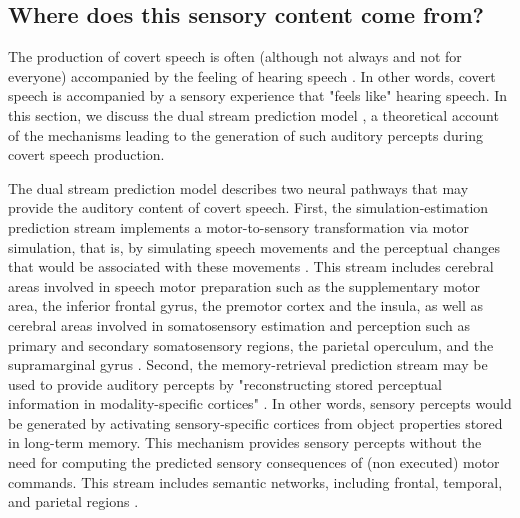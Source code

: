 \documentclass[utf8]{template/frontiersSCNS} %
\begin{document}
\subsection{Where does this sensory content come from?}

The production of covert speech is often (although not always and not for everyone) accompanied by the feeling of hearing speech \cite{hurlburt_investigating_2011}. In other words, covert speech is accompanied by a sensory experience that "feels like" hearing speech. In this section, we discuss the dual stream prediction model \citep{tian_mental_2012, tian_effect_2013, tian_mental_2016}, a theoretical account of the mechanisms leading to the generation of such auditory percepts during covert speech production.


The dual stream prediction model \citep{tian_mental_2012, tian_effect_2013, tian_mental_2016} describes two neural pathways that may provide the auditory content of covert speech. First, the simulation-estimation prediction stream implements a motor-to-sensory transformation via motor simulation, that is, by simulating speech movements and the perceptual changes that would be associated with these movements \citep[see also][for a similar proposal]{loevenbruck_cognitive_2018}. This stream includes cerebral areas involved in speech motor preparation such as the supplementary motor area, the inferior frontal gyrus, the premotor cortex and the insula, as well as cerebral areas involved in somatosensory estimation and perception such as primary and secondary somatosensory regions, the parietal operculum, and the supramarginal gyrus \citep{tian_mental_2016}. Second, the memory-retrieval prediction stream may be used to provide auditory percepts by "reconstructing stored perceptual information in modality-specific cortices" \citep{tian_mental_2016}. In other words, sensory percepts would be generated by activating sensory-specific cortices from object properties stored in long-term memory. This mechanism provides sensory percepts without the need for computing the predicted sensory consequences of (non executed) motor commands. This stream includes semantic networks, including frontal, temporal, and parietal regions \citep[for more details, see][]{tian_mental_2016}.

\end{document}
